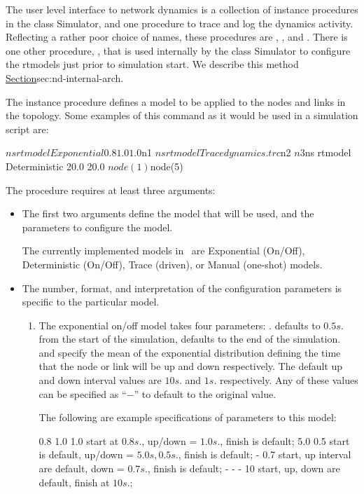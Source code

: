 The user level interface to network dynamics is a collection 
of instance procedures in the class Simulator,
and one procedure to trace and log the dynamics activity.
Reflecting a rather poor choice of names,
these procedures are
, , and .
There is one other procedure, ,
that is used internally by the class Simulator to configure
the rtmodels just prior to simulation start.
We describe this method \href{later}{Section}{sec:nd-internal-arch}.
\begin{list}{---}{}
\item The instance procedure
defines a model to be applied to the nodes and links in the topology.
Some examples of this command as it would be used in a simulation script are:
\begin{program}
        $ns rtmodel Exponential {0.8 1.0 1.0} $n1
        $ns rtmodel Trace dynamics.trc  $n2 $n3
        $ns rtmodel Deterministic {20.0 20.0} $node(1) $node(5)
\end{program}
The procedure requires at least three arguments:
\begin{itemize}
\item %
The first two arguments define the model that will be used, and the
parameters to configure the model.

The currently implemented models in \ns\ are
Exponential (On/Off), Deterministic (On/Off), Trace (driven), or
Manual (one-shot) models.

\item %
The number, format, and interpretation of the configuration parameters
is specific to the particular model.
\begin{enumerate}\itemsep0pt
\item The exponential on/off model takes four parameters:
.
 defaults to $0.5s.$ from the start of the simulation,
 defaults to the end of the simulation.
 and  specify
the mean of the exponential distribution defining the time
that the node or link will be up and down respectively.
The default up and down interval values are $10s.$ and $1s.$ respectively.
Any of these values can be specified as ``$-$'' to default to the
original value.

The following are example specifications of parameters to this model:
\begin{program}
      0.8 1.0 1.0	\; start at \(0.8s.\), up/down = \(1.0s.\), finish is default;
      5.0 0.5           \; start is default, up/down = \(5.0s, 0.5s.\), finish is default;
      - 0.7             \; start, up interval are default, down = \(0.7s.\), finish is default;
      - - - 10          \; start, up, down are default, finish at \(10s.\);
\end{program}


\end{enumerate}
\end{itemize}
\end{list}
